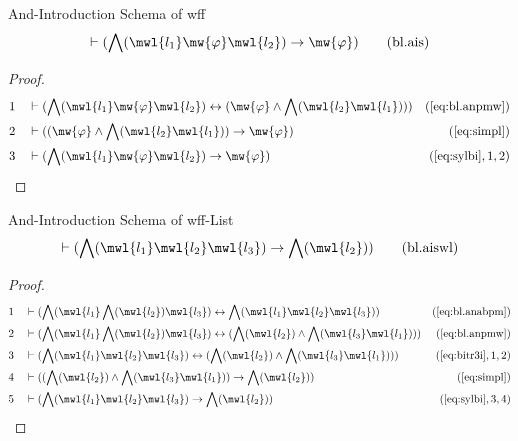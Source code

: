 \begin{lemma} And-Introduction Schema of wff
\begin{align}
\vdash ( \bigwedge( \mwl{l_1} \mw{\varphi} \mwl{l_2} ) \rightarrow \mw{\varphi}
    )\label{eq:bl.ais}\tag{bl.ais}
\end{align}
\end{lemma}

\begin{proof}
\begin{align}
  1 &&  & \vdash ( \bigwedge( \mwl{l_1} \mw{\varphi} \mwl{l_2} ) \leftrightarrow ( \mw{\varphi} \wedge \bigwedge( \mwl{l_2} \mwl{l_1} ) ) )&(\mbox{\ref{eq:bl.anpmw}})\notag
  \\ 2 &&  & \vdash ( ( \mw{\varphi} \wedge \bigwedge( \mwl{l_2} \mwl{l_1} ) ) \rightarrow \mw{\varphi} )&(\mbox{\ref{eq:simpl}})\notag
  \\ 3 &&  & \vdash ( \bigwedge( \mwl{l_1} \mw{\varphi} \mwl{l_2} ) \rightarrow \mw{\varphi} )&(\mbox{\ref{eq:sylbi}},1,2)\notag
\end{align}
\end{proof}

\begin{lemma} And-Introduction Schema of wff-List
\begin{align}
\vdash ( \bigwedge( \mwl{l_1} \mwl{l_2} \mwl{l_3} ) \rightarrow \bigwedge(
    \mwl{l_2} ) )\label{eq:bl.aiswl}\tag{bl.aiswl}
\end{align}
\end{lemma}

\begin{proof}
\begin{align}
  1 &&  & \vdash ( \bigwedge( \mwl{l_1} \bigwedge( \mwl{l_2} ) \mwl{l_3} ) \leftrightarrow \bigwedge( \mwl{l_1} \mwl{l_2} \mwl{l_3} ) )&(\mbox{\ref{eq:bl.anabpm}})\notag
  \\ 2 &&  & \vdash ( \bigwedge( \mwl{l_1} \bigwedge( \mwl{l_2} ) \mwl{l_3} ) \leftrightarrow ( \bigwedge( \mwl{l_2} ) \wedge \bigwedge( \mwl{l_3} \mwl{l_1} ) ) )&(\mbox{\ref{eq:bl.anpmw}})\notag
  \\ 3 &&  & \vdash ( \bigwedge( \mwl{l_1} \mwl{l_2} \mwl{l_3} ) \leftrightarrow ( \bigwedge( \mwl{l_2} ) \wedge \bigwedge( \mwl{l_3} \mwl{l_1} ) ) )&(\mbox{\ref{eq:bitr3i}},1,2)\notag
  \\ 4 &&  & \vdash ( ( \bigwedge( \mwl{l_2} ) \wedge \bigwedge( \mwl{l_3} \mwl{l_1} ) ) \rightarrow \bigwedge( \mwl{l_2} ) )&(\mbox{\ref{eq:simpl}})\notag
  \\ 5 &&  & \vdash ( \bigwedge( \mwl{l_1} \mwl{l_2} \mwl{l_3} ) \rightarrow \bigwedge( \mwl{l_2} ) )&(\mbox{\ref{eq:sylbi}},3,4)\notag
\end{align}
\end{proof}

